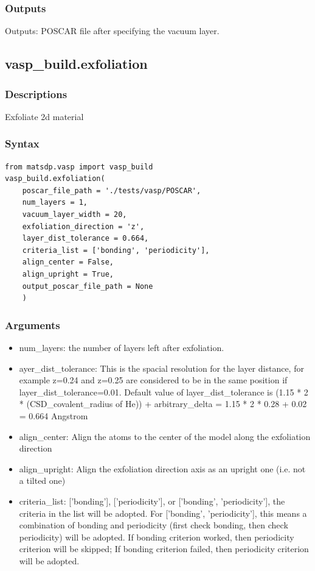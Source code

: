 \documentclass[12pt]{book}
\begin{document}
\subsubsection{Outputs}
Outputs: POSCAR file after specifying the vacuum layer.


\subsection{vasp\_build.exfoliation}
\subsubsection{Descriptions}
Exfoliate 2d material
\subsubsection{Syntax}
\begin{lstlisting}
from matsdp.vasp import vasp_build
vasp_build.exfoliation(
    poscar_file_path = './tests/vasp/POSCAR', 
    num_layers = 1, 
    vacuum_layer_width = 20, 
    exfoliation_direction = 'z', 
    layer_dist_tolerance = 0.664, 
    criteria_list = ['bonding', 'periodicity'], 
    align_center = False, 
    align_upright = True, 
    output_poscar_file_path = None
    )
\end{lstlisting}
\subsubsection{Arguments}
\begin{itemize}
\item num\_layers: the number of layers left after exfoliation.
\item ayer\_dist\_tolerance: This is the spacial resolution for the layer distance, for example z=0.24 and z=0.25 are considered to be in the same position if layer\_dist\_tolerance=0.01. Default value of layer\_dist\_tolerance is (1.15 * 2 * (CSD\_covalent\_radius of He)) + arbitrary\_delta = 1.15 * 2 * 0.28 + 0.02 = 0.664 Angstrom
\item align\_center: Align the atoms to the center of the model along the exfoliation direction
\item align\_upright: Align the exfoliation direction axis as an upright one (i.e. not a tilted one)
\item criteria\_list: ['bonding'], ['periodicity'], or ['bonding', 'periodicity'], the criteria in the list will be adopted. For ['bonding', 'periodicity'], this means a combination of bonding and periodicity (first check bonding, then check periodicity) will be adopted. If bonding criterion worked, then periodicity criterion will be skipped; If bonding criterion failed, then periodicity criterion will be adopted.
\end{itemize}
\end{document}

